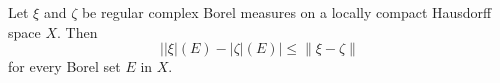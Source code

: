 Let $\xi$ and $\zeta$ be regular complex Borel measures on a locally compact Hausdorff space $X$. Then
$$\bigl||\xi|(E) - |\zeta|(E)\bigr| \leq \|\xi - \zeta\|$$
for every Borel set $E$ in $X$.
